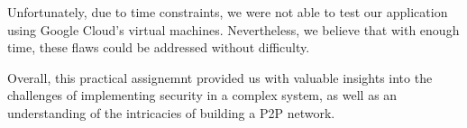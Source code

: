 \documentclass[a4paper, 11pt]{article}
\begin{document}
Unfortunately, due to time constraints, we were not able to test our application using Google Cloud's virtual machines. 
Nevertheless, we believe that with enough time, these flaws could be addressed without difficulty. 

Overall, this practical assignemnt provided us with valuable insights into the challenges of implementing security in a 
complex system, as well as an understanding of the intricacies of building a \ac{P2P} network.

\clearpage



\end{document}
